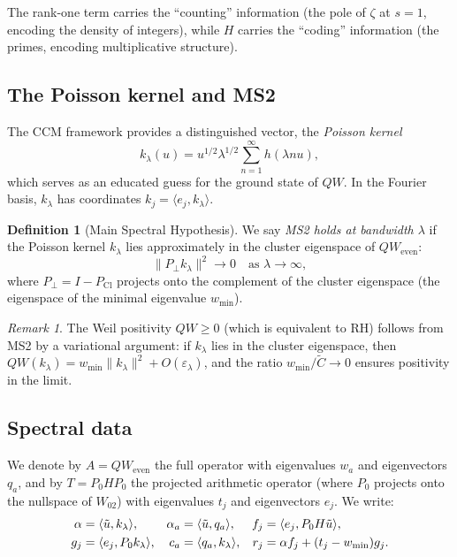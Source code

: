 \documentclass[12pt,a4paper]{article}
\theoremstyle{definition}
\newtheorem{definition}[theorem]{Definition}
\theoremstyle{remark}
\newtheorem{remark}[theorem]{Remark}
\newcommand{\Cl}{\mathrm{Cl}}
\newcommand{\ip}[2]{\langle #1, #2 \rangle}
\newcommand{\norm}[1]{\| #1 \|}
\newcommand{\utilde}{\tilde{u}}
\newcommand{\Ctilde}{\tilde{C}}
\newcommand{\wmin}{w_{\min}}
\begin{document}
The rank-one term carries the ``counting'' information (the pole of
$\zeta$ at $s = 1$, encoding the density of integers), while $H$ carries
the ``coding'' information (the primes, encoding multiplicative structure).

\subsection{The Poisson kernel and MS2}

The CCM framework provides a distinguished vector, the
\emph{Poisson kernel}
\begin{equation}
\label{eq:poisson}
k_\lambda(u) = u^{1/2} \lambda^{1/2} \sum_{n=1}^\infty h(\lambda n u),
\end{equation}
which serves as an educated guess for the ground state of $QW$.
In the Fourier basis, $k_\lambda$ has coordinates $k_j = \ip{e_j}{k_\lambda}$.

\begin{definition}[Main Spectral Hypothesis]
\label{def:MS2}
We say \emph{MS2 holds at bandwidth $\lambda$} if the Poisson kernel
$k_\lambda$ lies approximately in the cluster eigenspace of $QW_{\mathrm{even}}$:
\begin{equation}
\label{eq:MS2}
\norm{P_\perp k_\lambda}^2 \to 0 \quad \text{as } \lambda \to \infty,
\end{equation}
where $P_\perp = I - P_{\Cl}$ projects onto the complement of the
cluster eigenspace (the eigenspace of the minimal eigenvalue $\wmin$).
\end{definition}

\begin{remark}
The Weil positivity $QW \geq 0$ (which is equivalent to RH) follows
from MS2 by a variational argument: if $k_\lambda$ lies in the cluster
eigenspace, then $QW(k_\lambda) = \wmin \norm{k_\lambda}^2 + O(\varepsilon_\lambda)$,
and the ratio $\wmin / \Ctilde \to 0$ ensures positivity in the limit.
\end{remark}

\subsection{Spectral data}

We denote by $A = QW_{\mathrm{even}}$ the full operator with
eigenvalues $w_a$ and eigenvectors $q_a$, and by $T = P_0 H P_0$
the projected arithmetic operator (where $P_0$ projects onto the
nullspace of $W_{02}$) with eigenvalues $t_j$ and eigenvectors $e_j$.
We write:
\begin{align}
\alpha &= \ip{\utilde}{k_\lambda}, &
\alpha_a &= \ip{\utilde}{q_a}, &
f_j &= \ip{e_j}{P_0 H \utilde}, \\
g_j &= \ip{e_j}{P_0 k_\lambda}, &
c_a &= \ip{q_a}{k_\lambda}, &
r_j &= \alpha f_j + (t_j - \wmin) g_j. \notag
\end{align}
\end{document}
